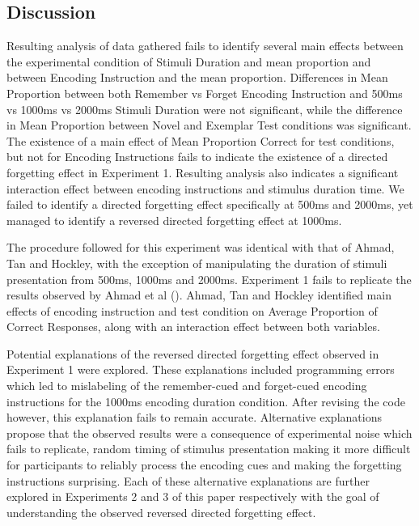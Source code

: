\documentclass[
  man,floatsintext]{apa6}
\begin{document}
\hypertarget{discussion}{%
\subsection{Discussion}\label{discussion}}

Resulting analysis of data gathered fails to identify several main effects between the experimental condition of Stimuli Duration and mean proportion and between Encoding Instruction and the mean proportion. Differences in Mean Proportion between both Remember vs Forget Encoding Instruction and 500ms vs 1000ms vs 2000ms Stimuli Duration were not significant, while the difference in Mean Proportion between Novel and Exemplar Test conditions was significant. The existence of a main effect of Mean Proportion Correct for test conditions, but not for Encoding Instructions fails to indicate the existence of a directed forgetting effect in Experiment 1. Resulting analysis also indicates a significant interaction effect between encoding instructions and stimulus duration time. We failed to identify a directed forgetting effect specifically at 500ms and 2000ms, yet managed to identify a reversed directed forgetting effect at 1000ms.

The procedure followed for this experiment was identical with that of Ahmad, Tan and Hockley, with the exception of manipulating the duration of stimuli presentation from 500ms, 1000ms and 2000ms. Experiment 1 fails to replicate the results observed by Ahmad et al (). Ahmad, Tan and Hockley identified main effects of encoding instruction and test condition on Average Proportion of Correct Responses, along with an interaction effect between both variables.

Potential explanations of the reversed directed forgetting effect observed in Experiment 1 were explored. These explanations included programming errors which led to mislabeling of the remember-cued and forget-cued encoding instructions for the 1000ms encoding duration condition. After revising the code however, this explanation fails to remain accurate. Alternative explanations propose that the observed results were a consequence of experimental noise which fails to replicate, random timing of stimulus presentation making it more difficult for participants to reliably process the encoding cues and making the forgetting instructions surprising. Each of these alternative explanations are further explored in Experiments 2 and 3 of this paper respectively with the goal of understanding the observed reversed directed forgetting effect.
\end{document}
